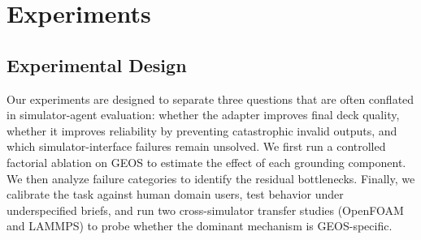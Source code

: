 \documentclass{article}
\begin{document}

\section{Experiments}
\label{sec:eval}







\subsection{Experimental Design}

Our experiments are designed to separate three questions that are often conflated in simulator-agent evaluation: 
whether the adapter improves final deck quality, whether it improves reliability by preventing catastrophic invalid 
outputs, and which simulator-interface failures remain unsolved. We first run a controlled factorial ablation on GEOS 
to estimate the effect of each grounding component. We then analyze failure categories to identify the residual 
bottlenecks. Finally, we calibrate the task against human domain users, test behavior under underspecified briefs,
and run two cross-simulator transfer studies (OpenFOAM and LAMMPS) to probe whether the dominant mechanism is GEOS-specific.
\end{document}

